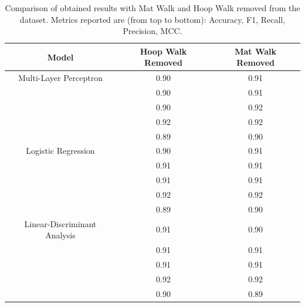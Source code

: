            \begin{table}[htbp]
                \centering
                \caption{Comparison of obtained results with Mat Walk and Hoop Walk removed from the dataset. Metrics reported are (from top to bottom): Accuracy, F1, Recall, Precision, MCC.}
                \label{tab:feature_engineering_approach_mat_hoop}
                \begin{tabular}{|c|c|c|}
                \hline
                \textbf{Model} & \textbf{Hoop Walk Removed} & \textbf{Mat Walk Removed} \\ \hline
                    Multi-Layer Perceptron          & 0.90 & 0.91 \\ 
                                                    & 0.90 & 0.91 \\ 
                                                    & 0.90 & 0.92 \\
                                                    & 0.92 & 0.92 \\ 
                                                    & 0.89 & 0.90 \\
                                                    \hline
                    Logistic Regression             & 0.90 & 0.91 \\ 
                                                    & 0.91 & 0.91 \\ 
                                                    & 0.91 & 0.91 \\ 
                                                    & 0.92 & 0.92 \\
                                                    & 0.89 & 0.90 \\
                                                    \hline
                    Linear-Discriminant Analysis    & 0.91 & 0.90 \\ 
                                                    & 0.91 & 0.91 \\ 
                                                    & 0.91 & 0.91 \\ 
                                                    & 0.92 & 0.92 \\
                                                    & 0.90 & 0.89 \\ 
                                                    \hline
                \end{tabular}
            \end{table}
\newpage
            
